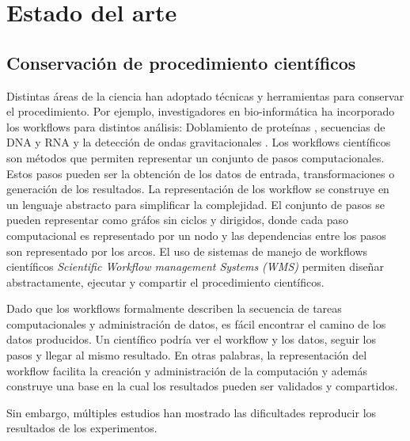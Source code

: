
\chapter{Estado del arte} %

\label{Chapter2} %



\section{Conservación de procedimiento científicos}

Distintas áreas de la ciencia han adoptado técnicas y herramientas para conservar el procedimiento. Por ejemplo, investigadores en bio-informática ha incorporado los workflows para distintos análisis: 
Doblamiento de proteínas \cite{craddock2006science}, secuencias de DNA y RNA \cite{blankenberg2010galaxy,giardine2005galaxy} y la detección de ondas gravitacionales \cite{deelman2004pegasus}.
Los workflows científicos son métodos que permiten representar un conjunto de pasos computacionales. Estos pasos pueden ser la obtención de los datos de entrada, transformaciones o generación de los resultados.
La representación de los workflow se construye en un lenguaje abstracto para simplificar la complejidad. El conjunto de pasos se pueden representar como gráfos sin ciclos y dirigidos, donde cada paso computacional es representado por un nodo y las dependencias entre los pasos son representado por los arcos.
El uso de sistemas de manejo de workflows científicos \textit{Scientific Workflow management Systems (WMS)} permiten diseñar abstractamente, ejecutar y compartir el procedimiento científicos. 

Dado que los workflows formalmente describen la secuencia de tareas computacionales y administración de datos, es fácil encontrar el camino de los datos producidos.
Un científico podría ver el workflow y los datos, seguir los pasos y llegar al mismo resultado. En otras palabras, la representación del workflow facilita la creación y administración de la computación y además construye una base en la cual los resultados pueden ser validados y compartidos.

Sin embargo, múltiples estudios han mostrado las dificultades reproducir los resultados de los experimentos.




